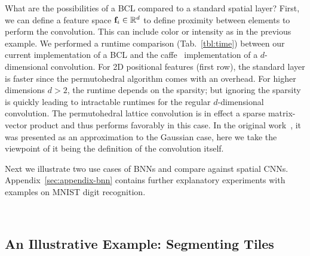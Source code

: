 What are the possibilities of a BCL compared to a standard spatial layer? First, we can define a
feature space $\mathbf{f}_i\in\mathbb{R}^d$ to define proximity between elements to perform
the convolution. This can include color or intensity as in the previous example.
We performed a runtime comparison (Tab.~\ref{tbl:time}) between
our current implementation of a BCL and the caffe~\cite{jia2014caffe} implementation of
a $d$-dimensional convolution. For 2D positional features (first row), the
standard layer is faster since the permutohedral algorithm comes with an overhead. For higher
dimensions $d>2$, the runtime depends on the sparsity; but ignoring the sparsity is quickly
leading to intractable runtimes for the regular $d$-dimensional convolution.
The permutohedral lattice convolution is in effect a sparse matrix-vector product and thus
performs favorably in this case. In the original work~\cite{adams2010fast}, it was presented
as an approximation to the Gaussian case, here we take the viewpoint of it being the definition of
the convolution itself.

Next we illustrate two use cases of BNNs and compare against spatial CNNs.
Appendix~\ref{sec:appendix-bnn} contains further explanatory experiments
with examples on MNIST digit recognition.

\begin{figure}[t!]
  \centering
  \\
  \label{fig:slate_experiment}
\end{figure}

\subsection{An Illustrative Example: Segmenting Tiles}

